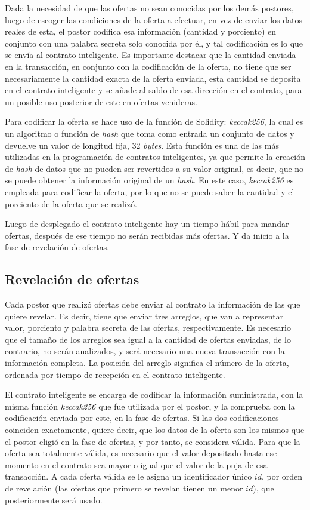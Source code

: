     Dada la necesidad de que las ofertas no sean conocidas por los demás postores, luego de escoger las condiciones de la oferta a efectuar, en vez de enviar los datos reales de esta, el postor codifica esa información (cantidad y porciento) en conjunto con una palabra secreta solo conocida por él, y tal codificación es lo que se envía al contrato inteligente. Es importante destacar que la cantidad enviada en la transacción, en conjunto con la codificación de la oferta, no tiene que ser necesariamente la cantidad exacta de la oferta enviada, esta cantidad se deposita en el contrato inteligente y se añade al saldo de esa dirección en el contrato, para un posible uso posterior de este en ofertas venideras.

    Para codificar la oferta se hace uso de la función de Solidity: \textit{keccak256}, la cual es un 
    algoritmo o función de \textit{hash} que toma como entrada un conjunto de datos y devuelve un valor de 
    longitud fija, 32 \textit{bytes}. Esta función es una de las más utilizadas en la programación de contratos 
    inteligentes, ya que permite la creación de \textit{hash} de datos que no pueden ser revertidos a su 
    valor original, es decir, que no se puede obtener la información original de un \textit{hash}. 
    En este caso, \textit{keccak256} es empleada para codificar la oferta, por lo que no se puede saber la 
    cantidad y el porciento de la oferta que se realizó.

    Luego de desplegado el contrato inteligente hay un tiempo hábil para mandar ofertas, después de ese tiempo no serán recibidas más ofertas. Y da inicio a la fase de revelación de ofertas.

    \subsection{Revelación de ofertas}
    Cada postor que realizó ofertas debe enviar al contrato la información de las que quiere revelar. Es decir, tiene que enviar tres arreglos, que van a representar valor, porciento y palabra secreta de las ofertas, respectivamente. Es necesario que el tamaño de los arreglos sea igual a la cantidad de ofertas enviadas, de lo contrario, no serán analizados, y será necesario una nueva transacción con la información completa. La posición del arreglo significa el número de la oferta, ordenada por tiempo de recepción en el contrato inteligente. 
    
    El contrato inteligente se encarga de codificar la información suministrada, con la misma función \textit{keccak256} que fue utilizada por el postor, y la comprueba con la codificación enviada por este, en la fase de ofertas. Si las dos codificaciones coinciden exactamente, quiere decir, que los datos de la oferta son los mismos que el postor eligió en la fase de ofertas, y por tanto, se considera válida. Para que la oferta sea totalmente válida, es necesario que el valor depositado hasta ese momento en el contrato sea mayor o igual que el valor de la puja de esa transacción. A cada oferta válida se le asigna un identificador único $id$, por orden de revelación (las ofertas que primero se revelan tienen un menor $id$), que posteriormente será usado.

